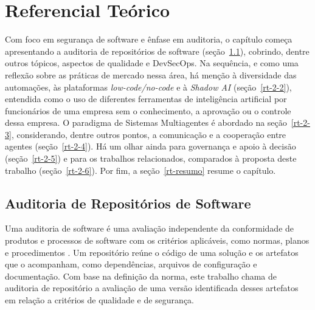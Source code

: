 
\chapter{Referencial Teórico}
\label{cap-referencial-teorico}

Com foco em segurança de software e ênfase em auditoria, o capítulo começa apresentando a auditoria de repositórios de software (seção~\ref{rt-2-1}), cobrindo, dentre outros tópicos, aspectos de qualidade e DevSecOps. Na sequência, e como uma reflexão sobre as práticas de mercado nessa área, há menção à diversidade das automações, às plataformas \textit{low-code/no-code} e à \textit{Shadow AI} (seção~\ref{rt-2-2}), entendida como o uso de diferentes ferramentas de inteligência artificial por funcionários de uma empresa sem o conhecimento, a aprovação ou o controle dessa empresa. O paradigma de Sistemas Multiagentes é abordado na seção~\ref{rt-2-3}, considerando, dentre outros pontos, a comunicação e a cooperação entre agentes (seção~\ref{rt-2-4}). Há um olhar ainda para governança e apoio à decisão (seção~\ref{rt-2-5}) e para os trabalhos relacionados, comparados à proposta deste trabalho (seção~\ref{rt-2-6}). Por fim, a seção~\ref{rt-resumo} resume o capítulo.

\section{Auditoria de Repositórios de Software}
\label{rt-2-1}

Uma auditoria de software é uma avaliação independente da conformidade de produtos e processos de software com os critérios aplicáveis, como normas, planos e procedimentos \cite{ieee1028}. Um repositório reúne o código de uma solução e os artefatos que o acompanham, como dependências, arquivos de configuração e documentação. Com base na definição da norma, este trabalho chama de auditoria de repositório a avaliação de uma versão identificada desses artefatos em relação a critérios de qualidade e de segurança.

